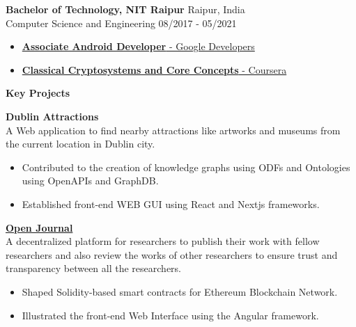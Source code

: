 \documentclass{article}
\begin{document}
\noindent \normalsize \textbf{Bachelor of Technology, NIT Raipur} \hfill Raipur, India \\
Computer Science and Engineering \hfill 08/2017 - 05/2021
\vspace{3pt}

\begin{itemize}[noitemsep,nolistsep,leftmargin=*]
    \item { \normalsize \href{https://www.credential.net/623b189c-719c-4845-b489-1b1618d4da79}{\textbf{Associate Android Developer} - Google Developers } }
    \item { \normalsize \href{https://www.coursera.org/account/accomplishments/certificate/X4CNCJXC335V}{\textbf{Classical Cryptosystems and Core Concepts} - Coursera} }
\end{itemize}
\vspace{3pt}
\noindent \large \textbf{\textcolor{NavyBlue}{Key Projects}} \vspace{3pt}

\noindent \normalsize \textbf{Dublin Attractions} \\
\noindent \normalsize A Web application to find nearby attractions like artworks and museums from the current location in Dublin city.
\begin{itemize}
    \item Contributed to the creation of knowledge graphs using ODFs and Ontologies using OpenAPIs and GraphDB. 
    \item Established front-end WEB GUI using React and Nextjs frameworks.
\end{itemize}
\vspace{3pt}

\noindent \normalsize \href{https://github.com/kdpisda/scientific-journal-blockchain}{\textbf{Open Journal}} \\
\noindent \normalsize A decentralized platform for researchers to publish their work with fellow researchers and also review the works of other researchers to ensure trust and transparency between all the researchers.
\begin{itemize}
    \item Shaped Solidity-based smart contracts for Ethereum Blockchain Network.
    \item Illustrated the front-end Web Interface using the Angular framework.
\end{itemize}
\vspace{3pt}
\end{document}
